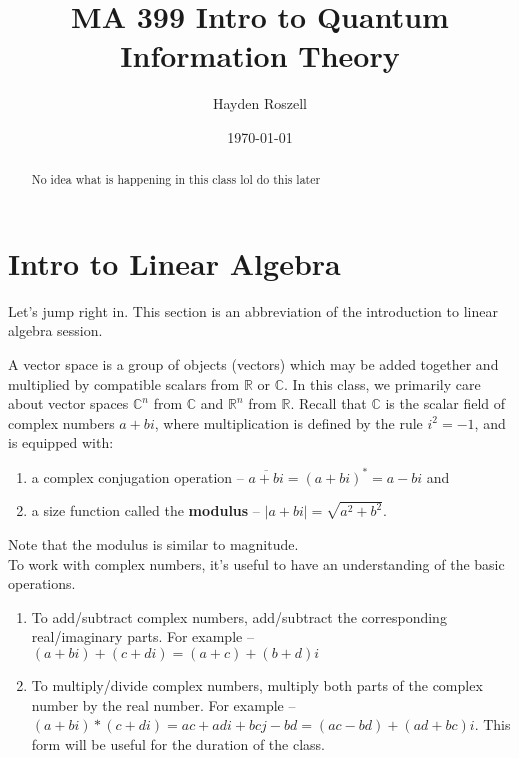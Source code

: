 \documentclass[12pt]{article}
\title{MA 399 Intro to Quantum Information Theory}
\author{Hayden Roszell}
\date{\today}
\theoremstyle{plain}
\theoremstyle{nonumberplain}
\theoremstyle{plain}
\theoremstyle{nonumberplain}
\newcommand\ol{\overline}
\newcommand\1{{\bf 1}}
\newcommand{\R}{\mathbb{R}} %
\newcommand{\C}{\mathbb{C}} %
\newcommand{\<}{\left\langle}
\renewcommand{\>}{\right\rangle}
\newcommand{\abs}[1]{\left\lvert #1 \right\rvert} %
\begin{document}
\maketitle
\begin{abstract}
No idea what is happening in this class lol do this later
\end{abstract}

\tableofcontents


\section{Intro to Linear Algebra}

Let's jump right in. This section is an abbreviation of the introduction to linear algebra session.

A vector space is a group of objects (vectors) which may be added together and multiplied by compatible scalars from $\R$ or $\C$. In this class, we primarily care about vector spaces $\C^n$ from $\C$ and $\R^n$ from $\R$. Recall that $\C$ is the scalar field of complex numbers $a+bi$, where multiplication is defined by the rule $i^2=-1$, and is equipped with:
\begin{enumerate}[label=(\alph*)]
    \item a complex conjugation operation -- $\ol{a+bi}=(a+bi)^*=a-bi$ and
    \item a size function called the \textbf{modulus} -- $\abs{a+bi}=\sqrt{a^2+b^2}.$
\end{enumerate}
Note that the modulus is similar to magnitude. \\
To work with complex numbers, it's useful to have an understanding of the basic operations.
\begin{enumerate}[label=(\alph*)]
	\item To add/subtract complex numbers, add/subtract the corresponding real/imaginary parts. For 		example -- $(a+bi)+(c+di)=(a+c)+(b+d)i$
	\item To multiply/divide complex numbers, multiply both parts of the complex number by the real 		number. For example -- $(a+bi)*(c+di)=ac+adi+bcj-bd=(ac-bd)+(ad+bc)i$. This form will be useful 		for the duration of the class.
\end{enumerate}

\end{document}
